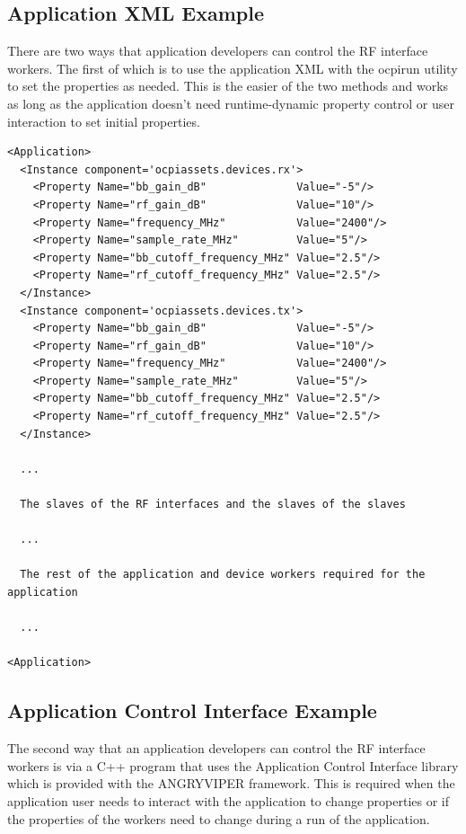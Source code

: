 \subsection{Application XML Example}
There are two ways that application developers can control the RF interface workers.  The first of which is to use the application XML with the ocpirun utility to set the properties as needed.  This is the easier of the two methods and works as long as the application doesn't need runtime-dynamic property control or user interaction to set initial properties.

\begin{verbatim}
<Application>
  <Instance component='ocpiassets.devices.rx'>
    <Property Name="bb_gain_dB"              Value="-5"/>
    <Property Name="rf_gain_dB"              Value="10"/>
    <Property Name="frequency_MHz"           Value="2400"/>
    <Property Name="sample_rate_MHz"         Value="5"/>
    <Property Name="bb_cutoff_frequency_MHz" Value="2.5"/>
    <Property Name="rf_cutoff_frequency_MHz" Value="2.5"/>
  </Instance>
  <Instance component='ocpiassets.devices.tx'>
    <Property Name="bb_gain_dB"              Value="-5"/>
    <Property Name="rf_gain_dB"              Value="10"/>
    <Property Name="frequency_MHz"           Value="2400"/>
    <Property Name="sample_rate_MHz"         Value="5"/>
    <Property Name="bb_cutoff_frequency_MHz" Value="2.5"/>
    <Property Name="rf_cutoff_frequency_MHz" Value="2.5"/>
  </Instance>

  ...

  The slaves of the RF interfaces and the slaves of the slaves

  ...

  The rest of the application and device workers required for the application

  ...

<Application>
\end{verbatim}

\newpage
\subsection{Application Control Interface Example}
The second way that an application developers can control the RF interface workers is via a C++ program that uses the Application Control Interface library which is provided with the ANGRYVIPER framework.  This is required when the application user needs to interact with the application to change properties or if the properties of the workers need to change during a run of the application.

